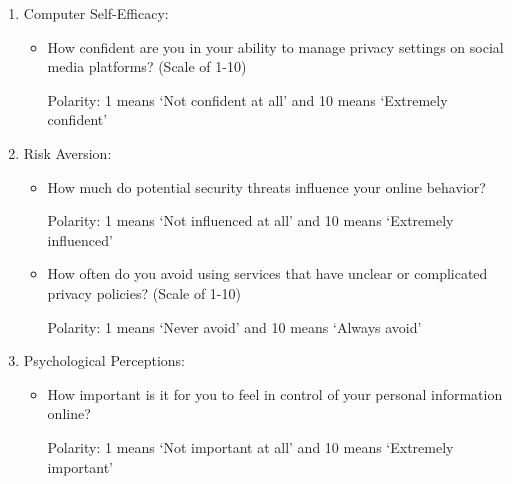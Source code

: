 \begin{enumerate}
\begin{itemize}
        
    \end{itemize}
\item Computer Self-Efficacy:
    \begin{itemize}
        \item How confident are you in your ability to manage privacy settings on social media platforms? (Scale of 1-10)

        Polarity: 1 means `Not confident at all’ and 10 means ‘Extremely confident’
        

    \end{itemize}
\item Risk Aversion:
    \begin{itemize}
        \item How much do potential security threats influence your online behavior?

        Polarity: 1 means ‘Not influenced at all’ and 10 means ‘Extremely influenced’
        
        \item How often do you avoid using services that have unclear or complicated privacy policies? (Scale of 1-10)

        Polarity: 1 means ‘Never avoid’ and 10 means ‘Always avoid’
    \end{itemize}
\item Psychological Perceptions:
    \begin{itemize}
        \item How important is it for you to feel in control of your personal information online?

        Polarity: 1 means ‘Not important at all’ and 10 means ‘Extremely important’
        

\end{itemize}
\end{enumerate}
